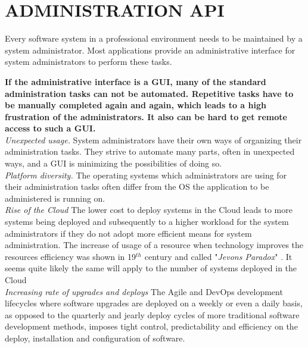 \newpage
\section*{ADMINISTRATION API}
Every software system in a professional environment needs to be maintained by a system administrator. Most applications provide an administrative interface for system administrators to perform these tasks.
\begin{center}
  
\end{center}
\textbf{If the administrative interface is a GUI, many of the standard administration tasks can not be automated. Repetitive tasks have to be manually completed again and again, which leads to a high frustration of the administrators. It also can be hard to get remote access to such a GUI.}\\

\textit{Unexpected usage.} System administrators have their own ways of organizing their administration tasks. They strive to automate many parts, often in unexpected ways, and a GUI is minimizing the possibilities of doing so.\\

\textit{Platform diversity.} The operating systems which administrators are using for their administration tasks often differ from the OS the application to be administered is running on.\\

\textit{Rise of the Cloud} The lower cost to deploy systems in the Cloud leads to more systems being deployed and subsequently to a higher workload for the system administrators if they do not adopt more efficient means for system administration. The increase of usage of a resource when technology improves the resources efficiency was shown in 19$^{th}$ century and called "\textit{Jevons Paradox}" \cite{Polimeni2008}. It seems quite likely the same will apply to the number of systems deployed in the Cloud\\

\textit{Increasing rate of upgrades and deploys} The Agile and DevOps development lifecycles where software upgrades are deployed on a weekly or even a  daily basis, as opposed to the quarterly and jearly deploy cycles of more traditional software development methods, imposes tight control, predictability and efficiency on the deploy, installation and configuration of software. \cite{Humble2010}
\begin{center}
   
\end{center}

